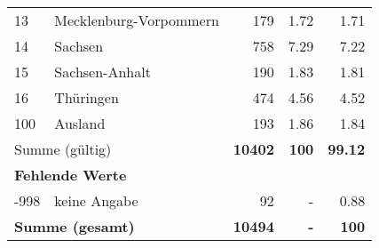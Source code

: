 \begin{longtable}{lXrrr}
     13 &
     \multicolumn{1}{X}{ Mecklenburg-Vorpommern   } &


       \num{179} &
       \num[round-mode=places,round-precision=2]{1.72} &
         \num[round-mode=places,round-precision=2]{1.71} \\

     14 &
     \multicolumn{1}{X}{ Sachsen   } &


       \num{758} &
       \num[round-mode=places,round-precision=2]{7.29} &
         \num[round-mode=places,round-precision=2]{7.22} \\

     15 &
     \multicolumn{1}{X}{ Sachsen-Anhalt   } &


       \num{190} &
       \num[round-mode=places,round-precision=2]{1.83} &
         \num[round-mode=places,round-precision=2]{1.81} \\

     16 &
     \multicolumn{1}{X}{ Thüringen   } &


       \num{474} &
       \num[round-mode=places,round-precision=2]{4.56} &
         \num[round-mode=places,round-precision=2]{4.52} \\

     100 &
     \multicolumn{1}{X}{ Ausland   } &


       \num{193} &
       \num[round-mode=places,round-precision=2]{1.86} &
         \num[round-mode=places,round-precision=2]{1.84} \\
     \midrule
     \multicolumn{2}{l}{Summe (gültig)} &
       \textbf{\num{10402}} &
     \textbf{\num{100}} &
       \textbf{\num[round-mode=places,round-precision=2]{99.12}} \\
     \multicolumn{5}{l}{\textbf{Fehlende Werte}}\\
       -998 &
       keine Angabe &
         \num{92} &
        - &
         \num[round-mode=places,round-precision=2]{0.88} \\
     \midrule
     \multicolumn{2}{l}{\textbf{Summe (gesamt)}} &
          \textbf{\num{10494}} &
        \textbf{-} &
        \textbf{\num{100}} \\
     \bottomrule
     \end{longtable}
     
